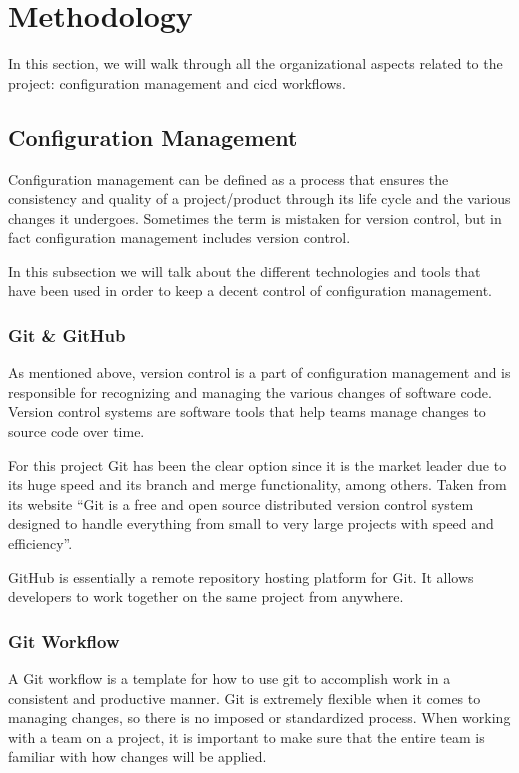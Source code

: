 \chapter{Methodology}
\label{mt:methodology}

In this section, we will walk through all the organizational aspects related to the project: configuration management and \gls{cicd} workflows.

\section{Configuration Management}

Configuration management can be defined as a process that ensures the consistency and quality of a project/product through its life cycle and the various changes it undergoes. Sometimes the term is mistaken for version control, but in fact configuration management includes version control.

In this subsection we will talk about the different technologies and tools that have been used in order to keep a decent control of configuration management.

\subsection{Git \& GitHub}

As mentioned above, version control is a part of configuration management and is responsible for recognizing and managing the various changes of software code. Version control systems are software tools that help teams manage changes to source code over time. 

For this project Git has been the clear option since it is the market leader due to its huge speed and its branch and merge functionality, among others. Taken from its website \enquote{Git is a free and open source distributed version control system designed to handle everything from small to very large projects with speed and efficiency}.

GitHub is essentially a remote repository hosting platform for Git. It allows developers to work together on the same project from anywhere.

\subsection{Git Workflow}

A Git workflow is a template for how to use git to accomplish work in a consistent and productive manner. Git is extremely flexible when it comes to managing changes, so there is no imposed or standardized process. When working with a team on a project, it is important to make sure that the entire team is familiar with how changes will be applied. 

